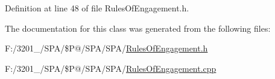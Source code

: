 Definition at line 48 of file Rules\-Of\-Engagement.\-h.



The documentation for this class was generated from the following files\-:\begin{DoxyCompactItemize}
\item 
F\-:/3201\-\_/\-S\-P\-A/\$\-P@/\-S\-P\-A/\-S\-P\-A/\hyperlink{_rules_of_engagement_8h}{Rules\-Of\-Engagement.\-h}\item 
F\-:/3201\-\_/\-S\-P\-A/\$\-P@/\-S\-P\-A/\-S\-P\-A/\hyperlink{_rules_of_engagement_8cpp}{Rules\-Of\-Engagement.\-cpp}\end{DoxyCompactItemize}
